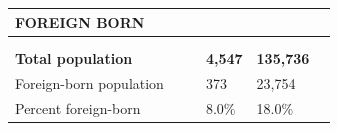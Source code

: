\documentclass[9pt]{report}
\begin{document}
\newpage
\setlength{\tabcolsep}{.01in} %
\begin{tabular}{p{.10in}p{.10in}p{.10in}p{3.7in}>{\hfill}p{.85in}>{\hfill}p{.85in}>{\hfill}p{.85in}>{\hfill}p{.85in}p{0.1in}}
\multicolumn{9}{l}{\parbox{7.1in}{\raggedright{\large{\strut\textbf{FOREIGN BORN}\strut}}}} \\ 
\hline
\multicolumn{4}{l}{\parbox{3.5in}{\raggedright{\textbf{}}}} & \multicolumn{1}{r}{\parbox{.85in}{\strut\raggedleft{\textbf{}\strut}}} & \multicolumn{1}{r}{\parbox{.85in}{\strut\raggedleft{\textbf{}\strut}}} & \multicolumn{1}{r}{\parbox{.85in}{\strut{}}} & \multicolumn{1}{r}{\parbox{.85in}{\strut{}}} & \\ 
\multicolumn{9}{l}{} \\ 
\multicolumn{4}{l}{\parbox{3.5in}{\strut\raggedright{\textbf{Total population}\strut}}} & \textbf{} & \textbf{} & \textbf{4,547} & \textbf{135,736} & \textbf{} \\ 
\multicolumn{4}{l}{\parbox{3.6in}{\strut\raggedright{{Foreign-born population}}\strut}} &  &  & 373 & 23,754 & \multicolumn{1}{l}{}  \\ 
\multicolumn{4}{l}{\parbox{3.6in}{\strut\raggedright{{Percent foreign-born}}\strut}} &  &  & 8.0\% & 18.0\% & \multicolumn{1}{l}{}  \\ 

\end{tabular}
\setlength{\tabcolsep}{6pt} %
\end{document}
